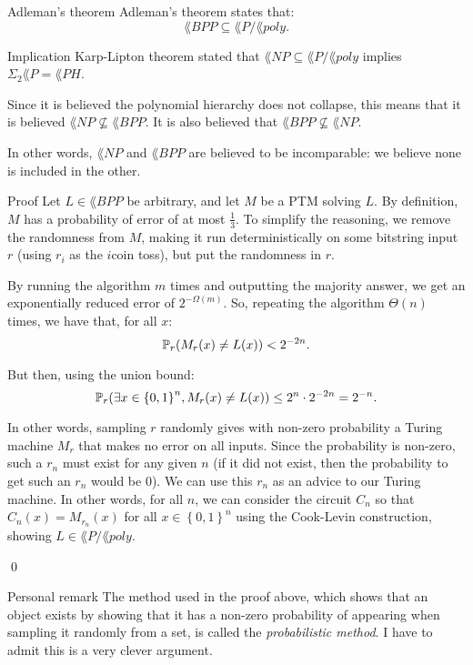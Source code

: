 \documentclass[a4paper]{article}
\begin{document}
\begin{parag}{Adleman's theorem}
    Adleman's theorem states that: 
    \[\lang{BPP} \subseteq \lang{P} / \lang{poly}.\]

    \begin{subparag}{Implication}
        Karp-Lipton theorem stated that $\lang{NP} \subseteq \lang{P} / \lang{poly}$ implies $\Sigma_2 \lang{P} = \lang{PH}$.

        Since it is believed the polynomial hierarchy does not collapse, this means that it is believed $\lang{NP} \not\subseteq \lang{BPP}$. It is also believed that $\lang{BPP} \not\subseteq \lang{NP}$.

        In other words, $\lang{NP}$ and $\lang{BPP}$ are believed to be incomparable: we believe none is included in the other.
    \end{subparag}

    \begin{subparag}{Proof}
        Let $L \in \lang{BPP}$ be arbitrary, and let $M$ be a PTM solving $L$. By definition, $M$ has a probability of error of at most $\frac{1}{3}$. To simplify the reasoning, we remove the randomness from $M$, making it run deterministically on some bitstring input $r$ (using $r_i$ as the $i$\Th coin toss), but put the randomness in $r$.

        By running the algorithm $m$ times and outputting the majority answer, we get an exponentially reduced error of $2^{- \Omega\left(m\right)}$. So, repeating the algorithm $\Theta\left(n\right)$ times, we have that, for all $x$: 
        \[\prob_r\left(M_r\left(x\right) \neq L\left(x\right)\right) < 2^{- 2n}.\]

        But then, using the union bound: 
        \[\prob_r\left(\exists x \in \left\{0, 1\right\}^n, M_r\left(x\right) \neq L\left(x\right)\right) \leq 2^n \cdot 2^{-2n} = 2^{-n}.\]

        In other words, sampling $r$ randomly gives with non-zero probability a Turing machine $M_r$ that makes no error on all inputs. Since the probability is non-zero, such a $r_n$ must exist for any given $n$ (if it did not exist, then the probability to get such an $r_n$ would be 0). We can use this $r_n$ as an advice to our Turing machine. In other words, for all $n$, we can consider the circuit $C_n$ so that $C_n\left(x\right) = M_{r_n}\left(x\right)$ for all $x \in \left\{0, 1\right\}^n$ using the Cook-Levin construction, showing $L \in \lang{P} / \lang{poly}$.

        \qed
    \end{subparag}

    \begin{subparag}{Personal remark}
        The method used in the proof above, which shows that an object exists by showing that it has a non-zero probability of appearing when sampling it randomly from a set, is called the \textit{probabilistic method}. I have to admit this is a very clever argument.
    \end{subparag}
\end{parag}
\end{document}
